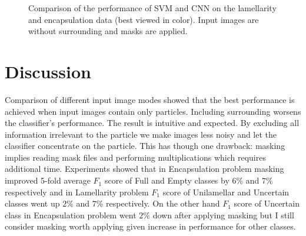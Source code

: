 \documentclass[a4paper, 11pt, table]{article}
\begin{document}
\begin{landscape}
\begin{figure}
\caption{\label{fig:svm_vs_cnn} Comparison of the performance of SVM and CNN  on the lamellarity and encapsulation data (best viewed in color). Input images are without surrounding and masks are applied.}
\end{figure}
 
\end{landscape}

\section{Discussion}

Comparison of different input image modes showed that the best performance is achieved when input images contain only particles. Including surrounding worsens the classifier's performance. The result is intuitive and expected. By excluding all information irrelevant to the particle we make images less noisy and let the classifier concentrate on the particle. This has though one drawback: masking implies reading mask files and performing multiplications which requires additional time. Experiments showed that in Encapsulation problem masking improved 5-fold average $F_1$ score of Full and Empty classes by $6\%$ and $7\%$ respectively and in Lamellarity problem $F_1$ score of Unilamellar and Uncertain classes went up $2\%$ and $7\%$ respectively. On the other hand $F_1$ score of Uncertain class in Encapsulation problem went $2\%$ down after applying masking but I still consider masking worth applying given increase in performance for other classes.
\end{document}
